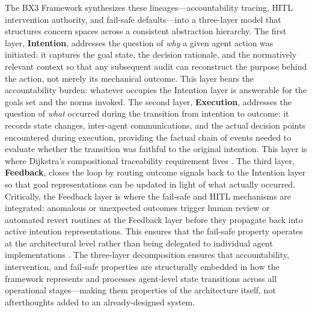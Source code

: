 The BX3 Framework synthesizes these lineages—accountability tracing, HITL intervention authority, and fail-safe defaults—into a three-layer model that structures concern spaces across a consistent abstraction hierarchy. The first layer, \textbf{Intention}, addresses the question of \emph{why} a given agent action was initiated: it captures the goal state, the decision rationale, and the normatively relevant context so that any subsequent audit can reconstruct the purpose behind the action, not merely its mechanical outcome. This layer bears the accountability burden: whatever occupies the Intention layer is answerable for the goals set and the norms invoked. The second layer, \textbf{Execution}, addresses the question of \emph{what} occurred during the transition from intention to outcome: it records state changes, inter-agent communications, and the actual decision points encountered during execution, providing the factual chain of events needed to evaluate whether the transition was faithful to the original intention. This layer is where Dijkstra's compositional traceability requirement lives \cite{dijkstra1982}. The third layer, \textbf{Feedback}, closes the loop by routing outcome signals back to the Intention layer so that goal representations can be updated in light of what actually occurred. Critically, the Feedback layer is where the fail-safe and HITL mechanisms are integrated: anomalous or unexpected outcomes trigger human review or automated revert routines at the Feedback layer before they propagate back into active intention representations. This ensures that the fail-safe property operates at the architectural level rather than being delegated to individual agent implementations \cite{wiener1948}. The three-layer decomposition ensures that accountability, intervention, and fail-safe properties are structurally embedded in how the framework represents and processes agent-level state transitions across all operational stages—making them properties of the architecture itself, not afterthoughts added to an already-designed system.